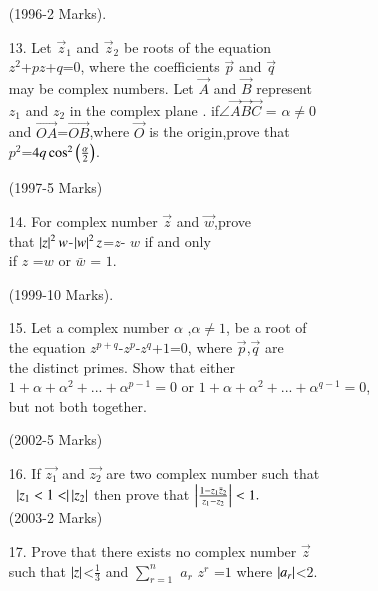 \documentclass[journal,12pt,twocolumn]{IEEEtran}
\theoremstyle{remark}
\begin{document}
\begin{enumerate}
\hfill(1996-2 Marks).\\

\item[13.] Let $\vec{z}_1$ and $\vec{z}_2$ be roots of the equation \\
$z^2$+$pz$+$q$=$0$, where the coefficients $\vec{p}$ and $\vec{q}$\\
may be complex numbers. Let $\Vec{A}$ and $\Vec{B}$ represent \\
$z_1$ and $z_2$ in the complex plane . if$\angle\Vec{A}\Vec{B}\Vec{C}$ = $\alpha \not=0$\\ 
and $\Vec{OA}$=$\Vec{OB}$,where $\vec{O}$ is the origin,prove that \\
$p^2$=$4q\cos^2\left(\frac{\alpha}{2}\right)$. 

\hfill(1997-5 Marks)\\

\item[14.] For complex number $\vec{z}$ and $\vec{w}$,prove \\
that $\left\vert z\right\vert^2w$-$\left\vert w\right\vert^2z$=$z$- $w$  if and only \\
if $z$ =$w$ or $\bar w$ = $1$.
   
\hfill(1999-10 Marks).\\


\item[15.] Let a complex number $\alpha$ ,$\alpha \not=1$, be a root of \\
the equation $z^{p+q}$-$z^p$-$z^q$+$1$=$0$, where $\Vec{p}$,$\Vec{q}$ are \\
the distinct primes. Show that either \\
$1+\alpha+\alpha^2+...+\alpha^{p-1}=0$ or $1+\alpha+\alpha^2+...+\alpha^{q- 1}=0$,\\
but not both together. 

\hfill(2002-5 Marks)\\

\item[16.] If $\vec{z_1}$ and $\vec{z_2}$ are two  complex number such that\\\
     $\left\vert z_1<1<\right\vert\left\vert z_2\right\vert$ then prove that $\left\vert\frac{1-z_1 \bar z_2}{z_1-z_2}\right\vert<1.$\\ 
    
    \hfill(2003-2 Marks)\\

\item[17.] Prove that there exists no  complex number $\vec{z}$ \\
      such that $\left\vert z\right\vert$<$\frac{1}{3}$ and  $\sum_{r=1}^{n}$ $a_r$ $z^r$ =$1$ where $\left\vert a_r\right\vert$<$2$.
    

\end{enumerate}
\end{document}
